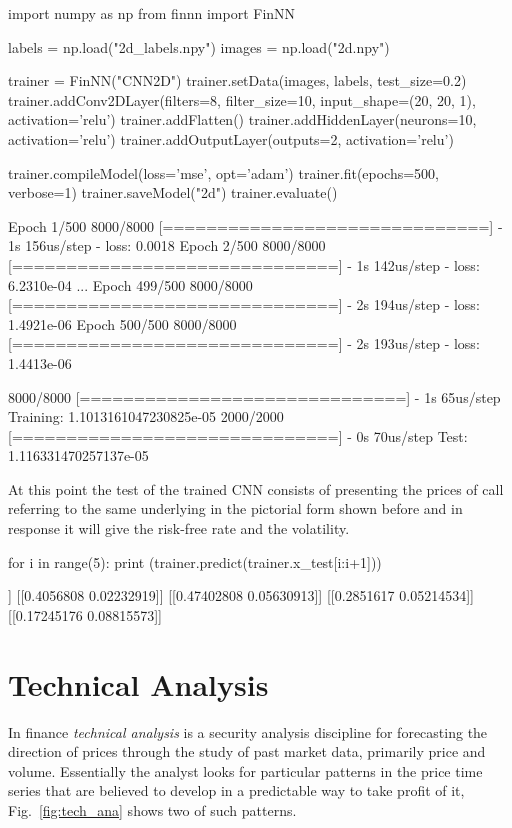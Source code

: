 \begin{ipython}
import numpy as np
from finnn import FinNN

labels = np.load("2d_labels.npy")
images = np.load("2d.npy")

trainer = FinNN("CNN2D")
trainer.setData(images, labels, test_size=0.2)
trainer.addConv2DLayer(filters=8, filter_size=10,
                       input_shape=(20, 20, 1), activation='relu')
trainer.addFlatten()
trainer.addHiddenLayer(neurons=10, activation='relu')
trainer.addOutputLayer(outputs=2, activation='relu')

trainer.compileModel(loss='mse', opt='adam')
trainer.fit(epochs=500, verbose=1)
trainer.saveModel("2d")
trainer.evaluate()
\end{ipython}
\begin{ioutput}
Epoch 1/500
8000/8000 [==============================] - 1s 156us/step - loss: 0.0018
Epoch 2/500
8000/8000 [==============================] - 1s 142us/step - loss: 6.2310e-04
...
Epoch 499/500
8000/8000 [==============================] - 2s 194us/step - loss: 1.4921e-06
Epoch 500/500
8000/8000 [==============================] - 2s 193us/step - loss: 1.4413e-06

8000/8000 [==============================] - 1s 65us/step
Training: 1.1013161047230825e-05
2000/2000 [==============================] - 0s 70us/step
Test: 1.116331470257137e-05
\end{ioutput}

At this point the test of the trained CNN consists of presenting the prices of call referring to the same underlying in the pictorial form shown before and in response it will give the risk-free rate and the volatility.

\begin{ipython}
for i in range(5):
    print (trainer.predict(trainer.x_test[i:i+1]))
\end{ipython}
\begin{ioutput}
[[0.3825101  0.09229672]]
[[0.4056808  0.02232919]]
[[0.47402808 0.05630913]]
[[0.2851617  0.05214534]]
[[0.17245176 0.08815573]]
\end{ioutput}

\section{Technical Analysis}
\label{technical-analysis}

In finance \emph{technical analysis} is a security analysis discipline for forecasting the direction of prices through the study of past market data, primarily price and volume. Essentially the analyst looks for particular patterns in the price time series that are believed to develop in a predictable way to take profit of it, Fig.~\ref{fig:tech_ana} shows two of such patterns.


